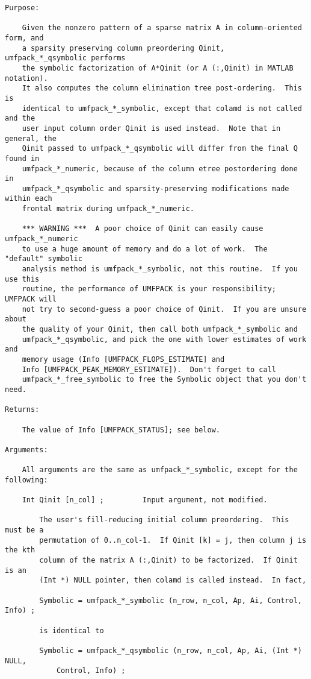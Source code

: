 {\begin{verbatim}
Purpose:

    Given the nonzero pattern of a sparse matrix A in column-oriented form, and
    a sparsity preserving column preordering Qinit, umfpack_*_qsymbolic performs
    the symbolic factorization of A*Qinit (or A (:,Qinit) in MATLAB notation).
    It also computes the column elimination tree post-ordering.  This is
    identical to umfpack_*_symbolic, except that colamd is not called and the
    user input column order Qinit is used instead.  Note that in general, the
    Qinit passed to umfpack_*_qsymbolic will differ from the final Q found in
    umfpack_*_numeric, because of the column etree postordering done in
    umfpack_*_qsymbolic and sparsity-preserving modifications made within each
    frontal matrix during umfpack_*_numeric.

    *** WARNING ***  A poor choice of Qinit can easily cause umfpack_*_numeric
    to use a huge amount of memory and do a lot of work.  The "default" symbolic
    analysis method is umfpack_*_symbolic, not this routine.  If you use this
    routine, the performance of UMFPACK is your responsibility;  UMFPACK will
    not try to second-guess a poor choice of Qinit.  If you are unsure about
    the quality of your Qinit, then call both umfpack_*_symbolic and
    umfpack_*_qsymbolic, and pick the one with lower estimates of work and
    memory usage (Info [UMFPACK_FLOPS_ESTIMATE] and
    Info [UMFPACK_PEAK_MEMORY_ESTIMATE]).  Don't forget to call
    umfpack_*_free_symbolic to free the Symbolic object that you don't need.

Returns:

    The value of Info [UMFPACK_STATUS]; see below.

Arguments:

    All arguments are the same as umfpack_*_symbolic, except for the following:

    Int Qinit [n_col] ;         Input argument, not modified.

        The user's fill-reducing initial column preordering.  This must be a
        permutation of 0..n_col-1.  If Qinit [k] = j, then column j is the kth
        column of the matrix A (:,Qinit) to be factorized.  If Qinit is an
        (Int *) NULL pointer, then colamd is called instead.  In fact,

        Symbolic = umfpack_*_symbolic (n_row, n_col, Ap, Ai, Control, Info) ;

        is identical to

        Symbolic = umfpack_*_qsymbolic (n_row, n_col, Ap, Ai, (Int *) NULL,
            Control, Info) ;


\end{verbatim}}
